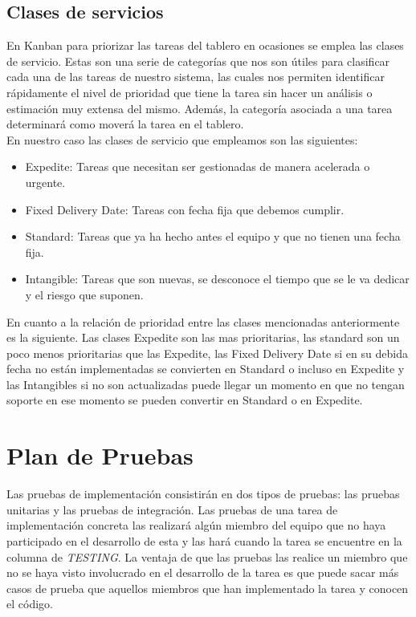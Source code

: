 \subsection{Clases de servicios}
En Kanban para priorizar las tareas del tablero en ocasiones se emplea las clases de servicio. Estas son una serie de categorías que nos son útiles para clasificar cada una de las tareas de nuestro sistema, las cuales nos permiten identificar rápidamente el nivel de prioridad que tiene la tarea sin hacer un análisis o estimación muy extensa del mismo. Además, la categoría asociada a una tarea determinará como moverá la tarea en el tablero.\\
En nuestro caso las clases de servicio que empleamos son las siguientes:
\begin{itemize}
    \item Expedite: Tareas que necesitan ser gestionadas de manera acelerada o urgente.
    \item Fixed Delivery Date: Tareas con fecha fija que debemos cumplir.
    \item Standard: Tareas que ya ha hecho antes el equipo y que no tienen una fecha fija.
    \item Intangible: Tareas que son nuevas, se desconoce el tiempo que se le va dedicar y el riesgo que suponen.
\end{itemize}
En cuanto a la relación de prioridad entre las clases mencionadas anteriormente es la siguiente. Las clases Expedite son las mas prioritarias, las standard son un poco menos prioritarias que las Expedite, las Fixed Delivery Date si en su debida fecha no están implementadas se convierten en Standard o incluso en Expedite y las Intangibles si no son actualizadas puede llegar un momento en que no tengan soporte en ese momento se pueden convertir en Standard o en Expedite.

\section{Plan de Pruebas}
\nocite{pipelineRedHat}
\nocite{testingSW}
\nocite{ciAmazon}

Las pruebas de implementación consistirán en dos tipos de pruebas: las pruebas unitarias y las pruebas de integración. Las pruebas de una tarea de implementación concreta las realizará algún miembro del equipo que no haya participado en el desarrollo de esta y las hará cuando la tarea se encuentre en la columna de \textit{TESTING}. La ventaja de que las pruebas las realice un miembro que no se haya visto involucrado en el desarrollo de la tarea es que puede sacar más casos de prueba que aquellos miembros que han implementado la tarea y conocen el código.

